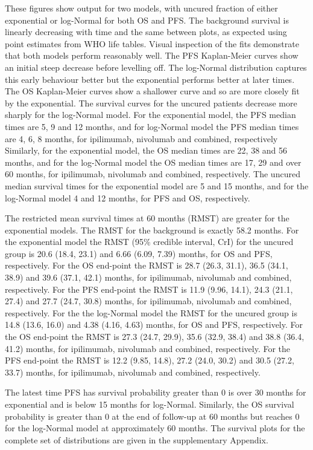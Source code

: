 \documentclass[AMA,STIX1COL]{WileyNJD-v2}
\begin{document}
These figures show output for two models, with uncured fraction of either exponential or log-Normal for both OS and PFS.
The background survival is linearly decreasing with time and the same between plots, as expected using point estimates from WHO life tables.
Visual inspection of the fits demonstrate that both models perform reasonably well.
The PFS Kaplan-Meier curves show an initial steep decrease before levelling off.
The log-Normal distribution captures this early behaviour better but the exponential performs better at later times.
The OS Kaplan-Meier curves show a shallower curve and so are more closely fit by the exponential.
The survival curves for the uncured patients decrease more sharply for the log-Normal model.
For the exponential model, the PFS median times are 5, 9 and 12 months,
and for log-Normal model the PFS median times are 4, 6, 8 months, for ipilimumab, nivolumab and combined, respectively
Similarly, for the exponential model, the OS median times are 22, 38 and 56 months,
and for the log-Normal model the OS median times are 17, 29 and over 60 months, for ipilimumab, nivolumab and combined, respectively.
The uncured median survival times for the exponential model are 5 and 15 months, and for the log-Normal model 4 and 12 months, for PFS and OS, respectively.

The restricted mean survival times at 60 months (RMST) are greater for the exponential models.
The RMST for the background is exactly 58.2 months.
For the exponential model the RMST (95\% credible interval, CrI) for the uncured group is 20.6 (18.4, 23.1) and 6.66 (6.09, 7.39) months, for OS and PFS, respectively. 
For the OS end-point the RMST is 28.7 (26.3, 31.1), 36.5 (34.1, 38.9) and 39.6 (37.1, 42.1) months, for ipilimumab, nivolumab and combined, respectively.
For the PFS end-point the RMST is 11.9 (9.96, 14.1), 24.3 (21.1, 27.4) and 27.7 (24.7, 30.8) months, for ipilimumab, nivolumab and combined, respectively.
For the the log-Normal model the RMST for the uncured group is 14.8 (13.6, 16.0) and 4.38 (4.16, 4.63) months, for OS and PFS, respectively. 
For the OS end-point the RMST is 27.3 (24.7, 29.9), 35.6 (32.9, 38.4) and 38.8 (36.4, 41.2) months, for ipilimumab, nivolumab and combined, respectively.
For the PFS end-point the RMST is 12.2 (9.85, 14.8), 27.2 (24.0, 30.2) and 30.5 (27.2, 33.7) months, for ipilimumab, nivolumab and combined, respectively.

The latest time PFS has survival probability greater than 0 is over 30 months for exponential and is below 15 months for log-Normal.
Similarly, the OS survival probability is greater than 0 at the end of follow-up at 60 months but reaches 0 for the log-Normal model at approximately 60 months.
The survival plots for the complete set of distributions are given in the supplementary Appendix.
\end{document}
